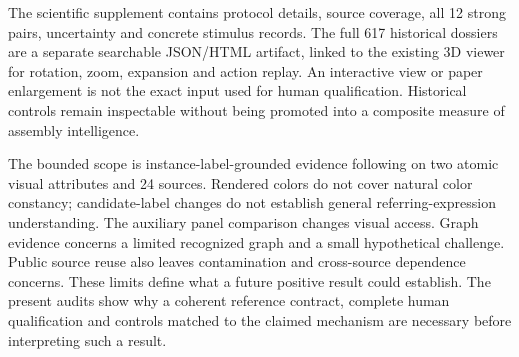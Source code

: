 \documentclass[10pt,twocolumn,letterpaper]{article}
\begin{document}
The scientific supplement contains protocol details, source coverage,
all 12 strong pairs, uncertainty and concrete stimulus records. The
full 617 historical dossiers are a separate searchable JSON/HTML
artifact, linked to the existing 3D viewer for rotation, zoom, expansion
and action replay. An interactive view or paper enlargement is not
the exact input used for human qualification. Historical controls
remain inspectable without being promoted into a composite measure
of assembly intelligence.

The bounded scope is instance-label-grounded evidence following on
two atomic visual attributes and 24 sources. Rendered colors do not
cover natural color constancy; candidate-label changes do not establish
general referring-expression understanding. The auxiliary panel
comparison changes visual access. Graph evidence concerns a limited
recognized graph and a small hypothetical challenge. Public source
reuse also leaves contamination and cross-source dependence concerns.
These limits define what a future positive result could establish.
The present audits show why a coherent reference contract, complete
human qualification and controls matched to the claimed mechanism
are necessary before interpreting such a result.

\clearpage
{\small


}
\end{document}
